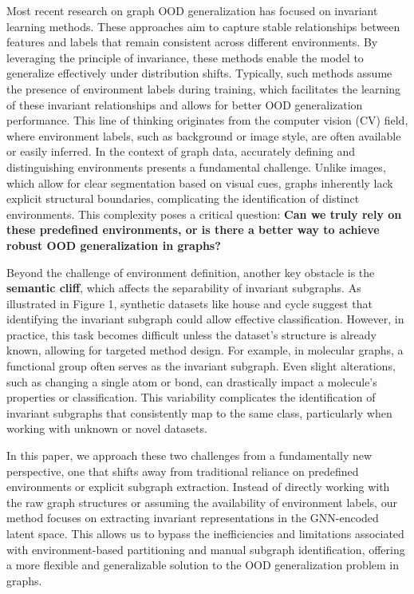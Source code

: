 Most recent research on graph OOD generalization has focused on invariant learning methods. These approaches aim to capture stable relationships between features and labels that remain consistent across different environments. By leveraging the principle of invariance, these methods enable the model to generalize effectively under distribution shifts. Typically, such methods assume the presence of environment labels during training, which facilitates the learning of these invariant relationships and allows for better OOD generalization performance.  This line of thinking originates from the computer vision (CV) field, where environment labels, such as background or image style, are often available or easily inferred.
In the context of graph data, accurately defining and distinguishing environments presents a fundamental challenge. Unlike images, which allow for clear segmentation based on visual cues, graphs inherently lack explicit structural boundaries, complicating the identification of distinct environments. This complexity poses a critical question: \textbf{Can we truly rely on these predefined environments, or is there a better way to achieve robust OOD generalization in graphs?}

Beyond the challenge of environment definition, another key obstacle is the \textbf{semantic cliff}, which affects the separability of invariant subgraphs. As illustrated in Figure 1, synthetic datasets like house and cycle suggest that identifying the invariant subgraph could allow effective classification. However, in practice, this task becomes difficult unless the dataset's structure is already known, allowing for targeted method design.
For example, in molecular graphs, a functional group often serves as the invariant subgraph. Even slight alterations, such as changing a single atom or bond, can drastically impact a molecule's properties or classification. This variability complicates the identification of invariant subgraphs that consistently map to the same class, particularly when working with unknown or novel datasets.

In this paper, we approach these two challenges from a fundamentally new perspective, one that shifts away from traditional reliance on predefined environments or explicit subgraph extraction. Instead of directly working with the raw graph structures or assuming the availability of environment labels, our method focuses on extracting invariant representations in the GNN-encoded latent space. This allows us to bypass the inefficiencies and limitations associated with environment-based partitioning and manual subgraph identification, offering a more flexible and generalizable solution to the OOD generalization problem in graphs.

